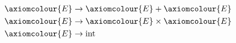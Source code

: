 \[
    \begin{aligned}
        \axiomcolour{E} & \to \axiomcolour{E}+\axiomcolour{E} \\
        \axiomcolour{E} & \to \axiomcolour{E}\times\axiomcolour{E} \\
        \axiomcolour{E} & \to \text{int}
    \end{aligned}
\]
